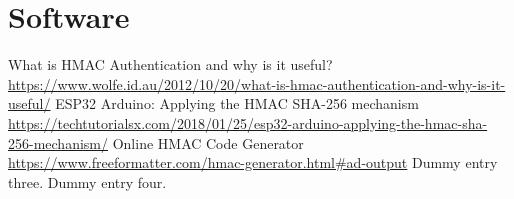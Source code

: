 \documentclass[
  10pt, %
  a4paper, %
  twoside, %
  openright, %
  numbers=noenddot, %
  BCOR=5mm, %
  parskip=half*, %
  thesis, %
]{bfhbook}
\begin{document}
\section{Software}
\listoffigures
\listoftables
\printglossary
\begin{thebibliography}{99}
    What is HMAC Authentication and why is it useful? \url{https://www.wolfe.id.au/2012/10/20/what-is-hmac-authentication-and-why-is-it-useful/}
     ESP32 Arduino: Applying the HMAC SHA-256 mechanism \url{https://techtutorialsx.com/2018/01/25/esp32-arduino-applying-the-hmac-sha-256-mechanism/}
     Online HMAC Code Generator \url{https://www.freeformatter.com/hmac-generator.html#ad-output}
     Dummy entry three.
     Dummy entry four.
  \end{thebibliography}
\end{document}
